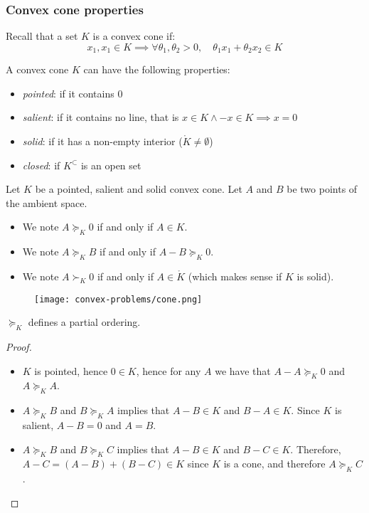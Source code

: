 \subsubsection{Convex cone properties}
Recall that a set $K$ is a convex cone if:
\begin{equation*}
    x_1, x_1\in K \implies \forall\theta_1, \theta_2>0, \quad \theta_1x_1+\theta_2x_2\in K
\end{equation*}

\begin{definition}
    A convex cone $K$ can have the following properties:
    \begin{itemize}
        \item \emph{pointed}: if it contains $0$
        \item \emph{salient}: if it contains no line, that is $x\in K \land -x\in K\implies x=0$
        \item \emph{solid}: if it has a non-empty interior ($\mathring{K}\neq\emptyset$)
        \item \emph{closed}: if $K^\subset$ is an open set
    \end{itemize}
\end{definition}

\begin{definition}[Notation]
    Let $K$ be a pointed, salient and solid convex cone. Let $A$ and $B$ be two points of the ambient space.
    \begin{itemize}
        \item We note $A\succcurlyeq_K 0$ if and only if $A\in K$.
        \item We note $A\succcurlyeq_K B$ if and only if $A-B\succcurlyeq_K 0$.
        \item We note $A\succ_K 0$ if and only if $A\in\mathring{K}$ (which makes sense if $K$ is solid).
    \end{itemize}
    \begin{figure}[H]
        \centering
        \texttt{[image: convex-problems/cone.png]}
    \end{figure}
\end{definition}

\begin{property}
    $\succcurlyeq_K$ defines a partial ordering.
\end{property}
\begin{proof}$ $
    \begin{itemize}
        \item $K$ is pointed, hence $0\in K$, hence for any $A$ we have that $A-A\succcurlyeq_K 0$ and $A\succcurlyeq_K A$.
        \item $A\succcurlyeq_K B$ and $B\succcurlyeq_K A$ implies that $A-B\in K$ and $B-A\in K$. Since $K$ is salient, $A-B=0$ and $A=B$.
        \item $A\succcurlyeq_K B$ and $B\succcurlyeq_K C$ implies that $A-B\in K$ and $B-C\in K$. Therefore, $A-C=(A-B)+(B-C)\in K$ since $K$ is a cone, and therefore $A\succcurlyeq_K C$.
    \end{itemize}
\end{proof}

